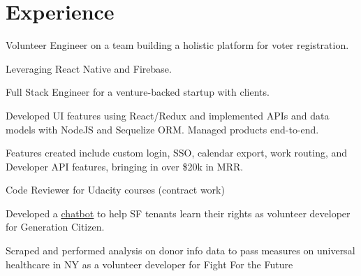 \documentclass[]{deedy-resume-openfont}
\begin{document}
\hfill
\begin{minipage}[t]{0.66\textwidth}


\section{Experience}

\vspace{\topsep} %
\begin{tightemize}

\item Volunteer Engineer on a team building a holistic platform for voter registration.
\item Leveraging React Native and Firebase.

\end{tightemize}
\sectionsep

\begin{tightemize}

\item Full Stack Engineer for a venture-backed startup with clients.
\item Developed UI features using React/Redux and implemented APIs and data models with NodeJS and Sequelize ORM. Managed products end-to-end.
\item Features created include custom login, SSO, calendar export, work routing, and Developer API features, bringing in over \$20k in MRR.

\end{tightemize}
\sectionsep

\begin{tightemize}

\item Code Reviewer for Udacity courses (contract work)
\item Developed a \color{blue}\underline{\href{https://github.com/rahul-nath/rentbot}{\color{blue}chatbot}} to help SF tenants learn their rights as volunteer developer for Generation Citizen.
\item Scraped and performed analysis on donor info data to pass measures on universal healthcare in NY as a volunteer developer for Fight For the Future
\end{tightemize}
\sectionsep



\end{minipage}
\end{document}
